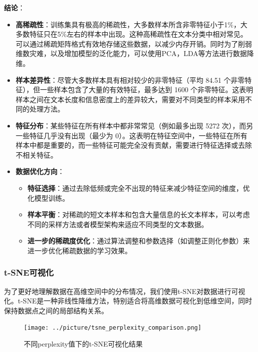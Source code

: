 \documentclass[11pt,a4paper]{article}
\begin{document}
\textbf{结论}：

\begin{itemize}
    \item \textbf{高稀疏性}：训练集具有极高的稀疏性，大多数样本所含非零特征小于1\%，大多数特征只在5\%左右的样本中出现。这种高稀疏性在文本分类中相对常见。可以通过稀疏矩阵格式有效地存储这些数据，以减少内存开销。同时为了削弱维数灾难，以及增加模型的泛化能力，可以使用PCA，LDA等方法进行数据降维。
    
    \item \textbf{样本差异性}：尽管大多数样本具有相对较少的非零特征（平均 84.51 个非零特征），但一些样本包含了大量的有效特征，最多达到 1600 个非零特征。这表明样本之间在文本长度和信息密度上的差异较大，需要对不同类型的样本采用不同的处理方法。
    
    \item \textbf{特征分布}：某些特征在所有样本中都非常常见（例如最多出现 5272 次），而另一些特征几乎没有出现（最少为 0）。这表明在特征空间中，一些特征在所有样本中都是重要的，而一些特征可能完全没有贡献，需要进行特征选择或去除不相关特征。
    
    \item \textbf{数据优化方向}：
    \begin{itemize}
        \item \textbf{特征选择}：通过去除低频或完全不出现的特征来减少特征空间的维度，优化模型训练。
        \item \textbf{样本平衡}：对稀疏的短文本样本和包含大量信息的长文本样本，可以考虑不同的采样方法或者模型架构来适应不同类型的文本数据。
        \item \textbf{进一步的稀疏度优化}：通过算法调整和参数选择（如调整正则化参数）来进一步优化稀疏数据的学习效果。
    \end{itemize}
\end{itemize}

\subsubsection{t-SNE可视化}
为了更好地理解数据在高维空间中的分布情况，我们使用t-SNE对数据进行可视化。t-SNE是一种非线性降维方法，特别适合将高维数据可视化到低维空间，同时保持数据点之间的局部结构关系。

\begin{figure}[htbp]
    \centering
    \texttt{[image: ../picture/tsne\_perplexity\_comparison.png]}
    \caption{不同perplexity值下的t-SNE可视化结果}
    \label{fig:tsne_perplexity}
\end{figure}
\end{document}
